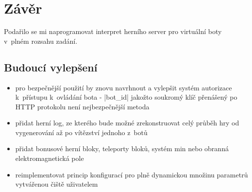 \section*{Závěr}
\label{sec:ending}

Podařilo se mi naprogramovat interpret herního server pro virtuální boty v~plném rozsahu zadání.

\subsection*{Budoucí vylepšení}

\begin{itemize}
 \item pro bezpečnější použití by znovu navrhnout a vylepšit systém autorizace k~přístupu k~ovládání bota - \ic|bot_id| jakožto soukromý klíč přenášený po HTTP protokolu není nejbezpečnější metoda
 \item přidat herní log, ze kterého bude možné zrekonstruovat celý průběh hry od vygenerování až po vítězství jednoho z~botů  
 \item přidat bonusové herní bloky, teleporty bloků, systém min nebo obranná elektromagnetická pole
 \item reimplementovat princip konfigurací pro plně dynamickou množinu parametrů vytvářenou čiště uživatelem
\end{itemize}

